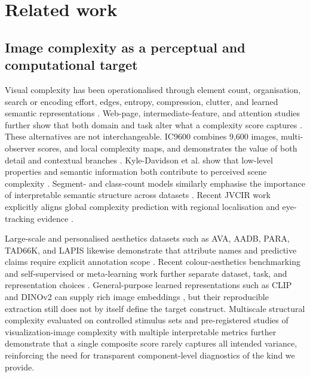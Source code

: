 \section{Related work}
\label{sec:related_work}

\subsection{Image complexity as a perceptual and computational target}

Visual complexity has been operationalised through element count, organisation, search or encoding effort, edges, entropy, compression, clutter, and learned semantic representations \citep{donderi2006visual,rosenholtz2007measuring,forsythe2011predicting}. Web-page, intermediate-feature, and attention studies further show that both domain and task alter what a complexity score captures \citep{wu2013webcomplexity,saraee2020complexity,sun2021curious}. These alternatives are not interchangeable. IC9600 combines 9,600 images, multi-observer scores, and local complexity maps, and demonstrates the value of both detail and contextual branches \citep{feng2023ic9600}. Kyle-Davidson et al. show that low-level properties and semantic information both contribute to perceived scene complexity \citep{kyledavidson2023complexity}. Segment- and class-count models similarly emphasise the importance of interpretable semantic structure across datasets \citep{shen2024simplicity}. Recent JVCIR work explicitly aligns global complexity prediction with regional localisation and eye-tracking evidence \citep{guo2026dual}.

Large-scale and personalised aesthetics datasets such as AVA, AADB, PARA, TAD66K, and LAPIS likewise demonstrate that attribute names and predictive claims require explicit annotation scope \citep{murray2012ava,kong2016photo,yang2022para,he2022tad66k,maerten2025lapis}. Recent colour-aesthetics benchmarking and self-supervised or meta-learning work further separate dataset, task, and representation choices \citep{he2023color,yang2024selfsupervised,yan2024hybrid}. General-purpose learned representations such as CLIP and DINOv2 can supply rich image embeddings \citep{radford2021clip,oquab2024dinov2}, but their reproducible extraction still does not by itself define the target construct. Multiscale structural complexity evaluated on controlled stimulus sets \citep{kravchenko2026multiscale} and pre-registered studies of visualization-image complexity with multiple interpretable metrics \citep{chu2026visualization} further demonstrate that a single composite score rarely captures all intended variance, reinforcing the need for transparent component-level diagnostics of the kind we provide.

